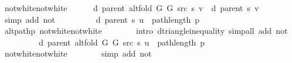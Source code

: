 \begin{isabellebody}
\ not{\isacharunderscore}{\kern0pt}white{\isacharunderscore}{\kern0pt}not{\isacharunderscore}{\kern0pt}white\isanewline
\ \ \ \ \isamarkupfalse%
\ {\isachardoublequoteopen}d\ {\isacharparenleft}{\kern0pt}parent\ {\isacharparenleft}{\kern0pt}alt{\isacharunderscore}{\kern0pt}fold\ G{}\ G{}\ src\ s{\isacharparenright}{\kern0pt}{\isacharparenright}{\kern0pt}\ v\ {\isacharequal}{\kern0pt}\ d\ {\isacharparenleft}{\kern0pt}parent\ s{\isacharparenright}{\kern0pt}\ v{\isachardoublequoteclose}\isanewline
\ \ \ \ \ \ \isamarkupfalse%
\ {\isacharparenleft}{\kern0pt}simp\ add{\isacharcolon}{\kern0pt}\ not{\isacharunderscore}{\kern0pt}{\isacharparenleft}{\kern0pt}{}{\isacharparenright}{\kern0pt}{\isacharparenright}{\kern0pt}\isanewline
\ \ \ \ \isamarkupfalse%
\ \isamarkupfalse%
\ {\isachardoublequoteopen}{\isachardot}{\kern0pt}{\isachardot}{\kern0pt}{\isachardot}{\kern0pt}\ {\isasymle}\ d\ {\isacharparenleft}{\kern0pt}parent\ s{\isacharparenright}{\kern0pt}\ u\ {\isacharplus}{\kern0pt}\ path{\isacharunderscore}{\kern0pt}length\ p{\isachardoublequoteclose}\isanewline
\ \ \ \ \ \ \isamarkupfalse%
\ alt{\isacharunderscore}{\kern0pt}path{\isacharunderscore}{\kern0pt}p\ not{\isacharunderscore}{\kern0pt}white{\isacharunderscore}{\kern0pt}not{\isacharunderscore}{\kern0pt}white\isanewline
\ \ \ \ \ \ \isamarkupfalse%
\ {\isacharparenleft}{\kern0pt}intro\ d{\isacharunderscore}{\kern0pt}triangle{\isacharunderscore}{\kern0pt}inequality{\isacharparenright}{\kern0pt}\ {\isacharparenleft}{\kern0pt}simp{\isacharunderscore}{\kern0pt}all\ add{\isacharcolon}{\kern0pt}\ not{\isacharunderscore}{\kern0pt}{\isacharparenleft}{\kern0pt}{}{\isacharparenright}{\kern0pt}{\isacharparenright}{\kern0pt}\isanewline
\ \ \ \ \isamarkupfalse%
\ \isamarkupfalse%
\ {\isachardoublequoteopen}{\isachardot}{\kern0pt}{\isachardot}{\kern0pt}{\isachardot}{\kern0pt}\ {\isacharequal}{\kern0pt}\ d\ {\isacharparenleft}{\kern0pt}parent\ {\isacharparenleft}{\kern0pt}alt{\isacharunderscore}{\kern0pt}fold\ G{}\ G{}\ src\ s{\isacharparenright}{\kern0pt}{\isacharparenright}{\kern0pt}\ u\ {\isacharplus}{\kern0pt}\ path{\isacharunderscore}{\kern0pt}length\ p{\isachardoublequoteclose}\isanewline
\ \ \ \ \ \ \isamarkupfalse%
\ not{\isacharunderscore}{\kern0pt}white{\isacharunderscore}{\kern0pt}not{\isacharunderscore}{\kern0pt}white\isanewline
\ \ \ \ \ \ \isamarkupfalse%
\ {\isacharparenleft}{\kern0pt}simp\ add{\isacharcolon}{\kern0pt}\ not{\isacharunderscore}{\kern0pt}{\isacharparenleft}{\kern0pt}{}{\isacharparenright}{\kern0pt}{\isacharparenright}{\kern0pt}\isanewline

\end{isabellebody}
